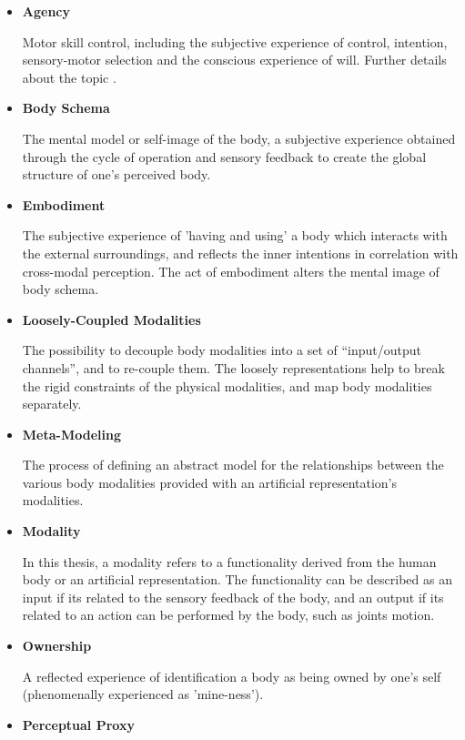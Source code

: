 \begin{itemize}
\item \textbf{Agency}

Motor skill control, including the subjective experience of control, intention, sensory-motor selection and the conscious experience of will. Further details about the topic \cite{roessler2003agency}.

\item \textbf{Body Schema}

The mental model or self-image of the body, a subjective experience obtained through the cycle of operation and sensory feedback to create the global structure of one's perceived body.

\item \textbf{Embodiment}

The subjective experience of 'having and using' a body which interacts with the external surroundings, and reflects the inner intentions in correlation with cross-modal perception. The act of embodiment alters the mental image of body schema.

\item \textbf{Loosely-Coupled Modalities}

The possibility to decouple body modalities into a set of ``input/output channels'', and to re-couple them. The loosely representations help to break the rigid constraints of the physical modalities, and map body modalities separately.

\item \textbf{Meta-Modeling}

The process of defining an abstract model for the relationships between the various body modalities provided with an artificial representation's modalities.

\item \textbf{Modality}

In this thesis, a modality refers to a functionality derived from the human body or an artificial representation. The functionality can be described as an input if its related to the sensory feedback of the body, and an output if its related to an action can be performed by the body, such as joints motion.

\item \textbf{Ownership}

A reflected experience of identification a body as being owned by one's self (phenomenally experienced as 'mine-ness').

\item \textbf{Perceptual Proxy}


\end{itemize}
